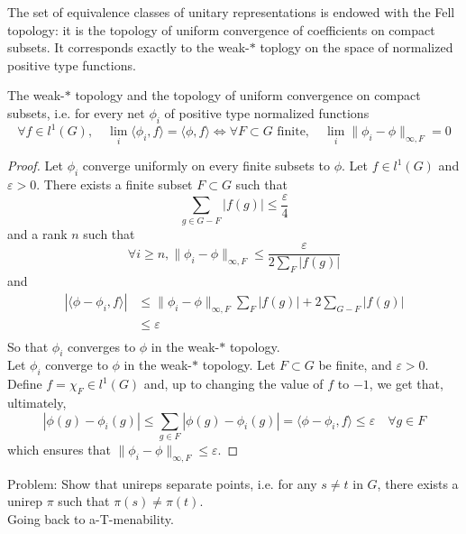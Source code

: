 The set of equivalence classes of unitary representations is endowed with the Fell topology: it is the topology of uniform convergence of coefficients on compact subsets. It corresponds exactly to the weak-$*$ toplogy on the space of normalized positive type functions.

\begin{thm} [Raikov]
The weak-$*$ topology and the topology of uniform convergence on compact subsets, i.e. for every net $\phi_i$ of positive type normalized functions 
\[ \forall f \in l^1(G), \quad \lim_i\langle \phi_i , f\rangle = \langle \phi , f\rangle \iff \forall F\subset G\text{ finite}, \quad \lim_i\|\phi_i -\phi\|_{\infty , F} = 0 \] 
\end{thm} 
\begin{proof}
Let $\phi_i$ converge uniformly on every finite subsets to $\phi$. Let $f\in l^1(G)$ and $\varepsilon>0$. There exists a finite subset $F\subset G$ such that 
\[\sum_{g\in G-F} |f(g)| \leq \frac{\varepsilon}{4}\]
and a rank $n$ such that 
\[\forall i\geq n, \|\phi_i -\phi\|_{\infty , F} \leq \frac{\varepsilon }{2\sum_{F} |f(g)| }\]
and 
\[\begin{split}
|\langle \phi - \phi_i , f \rangle | & \leq \|\phi_i -\phi\|_{\infty , F} \sum_{F} |f(g)|+2\sum_{G-F}|f(g)| \\
				& \leq \varepsilon \\ 
\end{split}\]
So that $\phi_i$ converges to $\phi$ in the weak-$*$ topology.\\
 
Let $\phi_i$ converge to $\phi$ in the weak-$*$ topology. Let $F\subset G$ be finite, and $\varepsilon>0$. Define $f=\chi_F\in l^1(G)$ and, up to changing the value of $f$ to $-1$, we get that, ultimately,  
\[ |\phi(g)-\phi_i(g)|\leq \sum_{g\in F} |\phi(g)-\phi_i(g)| = \langle \phi - \phi_i , f \rangle   \leq \varepsilon \quad \forall g\in F\]
which ensures that $\|\phi_i-\phi\|_{\infty, F}\leq \varepsilon$.
\end{proof}

Problem: Show that unireps separate points, i.e. for any $s\neq t$ in $G$, there exists a unirep $\pi$ such that $\pi(s)\neq \pi(t)$. \\

Going back to a-T-menability.

